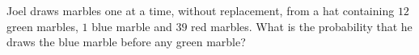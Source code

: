 Joel draws marbles one at a time, without replacement, from a hat containing $12$ green marbles, $1$ blue marble and $39$ red marbles. What is the probability that he draws the blue marble before any green marble?
